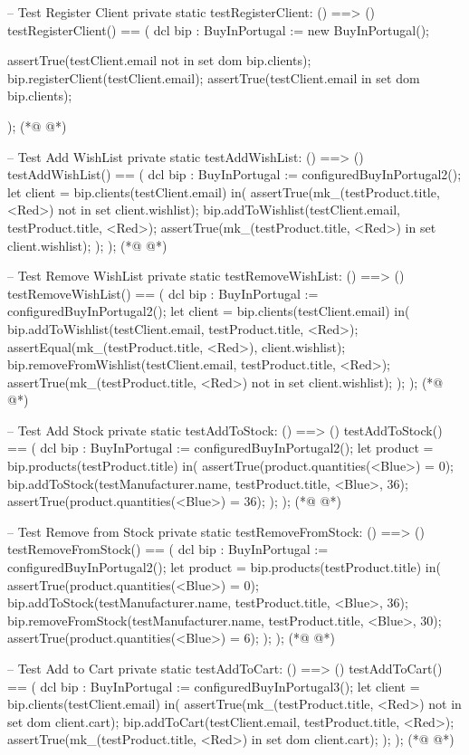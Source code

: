 \begin{vdmpp}[breaklines=true]
 -- Test Register Client
 private static testRegisterClient: () ==> ()
 testRegisterClient() == (
  dcl bip : BuyInPortugal := new BuyInPortugal();
  
  assertTrue(testClient.email not in set dom bip.clients);
  bip.registerClient(testClient.email);
  assertTrue(testClient.email in set dom bip.clients);
   
 );
(*@
\label{testAddToStock:263}
@*)
 
 -- Test Add WishList
 private static testAddWishList: () ==> ()
 testAddWishList() == (
  dcl bip : BuyInPortugal := configuredBuyInPortugal2();
  let client = bip.clients(testClient.email)
  in(
   assertTrue(mk_(testProduct.title, <Red>) not in set client.wishlist);
   bip.addToWishlist(testClient.email, testProduct.title, <Red>);
   assertTrue(mk_(testProduct.title, <Red>) in set client.wishlist);
  );
 );
(*@
\label{testRemoveFromStock:275}
@*)
 
 -- Test Remove WishList
 private static testRemoveWishList: () ==> ()
 testRemoveWishList() == (
  dcl bip : BuyInPortugal := configuredBuyInPortugal2();
  let client = bip.clients(testClient.email)
  in(
   bip.addToWishlist(testClient.email, testProduct.title, <Red>);
   assertEqual({mk_(testProduct.title, <Red>)}, client.wishlist);
   bip.removeFromWishlist(testClient.email, testProduct.title, <Red>);
   assertTrue(mk_(testProduct.title, <Red>) not in set client.wishlist);
  );
 );
(*@
\label{testAddToCart:288}
@*)
 
 -- Test Add Stock
 private static testAddToStock: () ==> ()
 testAddToStock() == (
  dcl bip : BuyInPortugal := configuredBuyInPortugal2();
  let product = bip.products(testProduct.title)
  in(
   assertTrue(product.quantities(<Blue>) = 0);
   bip.addToStock(testManufacturer.name, testProduct.title, <Blue>, 36);
   assertTrue(product.quantities(<Blue>) = 36);
  );
 );
(*@
\label{testQntAddToCart:300}
@*)
 
 -- Test Remove from Stock
 private static testRemoveFromStock: () ==> ()
 testRemoveFromStock() == (
  dcl bip : BuyInPortugal := configuredBuyInPortugal2();
  let product = bip.products(testProduct.title)
  in(
   assertTrue(product.quantities(<Blue>) = 0);
   bip.addToStock(testManufacturer.name, testProduct.title, <Blue>, 36);
   bip.removeFromStock(testManufacturer.name, testProduct.title, <Blue>, 30);
   assertTrue(product.quantities(<Blue>) = 6);
  );
 );
(*@
\label{testRemoveFromCart:313}
@*)
 
 -- Test Add to Cart
 private static testAddToCart: () ==> ()
 testAddToCart() == (
  dcl bip : BuyInPortugal := configuredBuyInPortugal3();
  let client = bip.clients(testClient.email)
  in(
   assertTrue(mk_(testProduct.title, <Red>)  not in set dom client.cart);
   bip.addToCart(testClient.email, testProduct.title, <Red>);
   assertTrue(mk_(testProduct.title, <Red>) in set dom client.cart);
  );
 );
(*@
\label{testConvertWishList:325}
@*)
 

\end{vdmpp}

